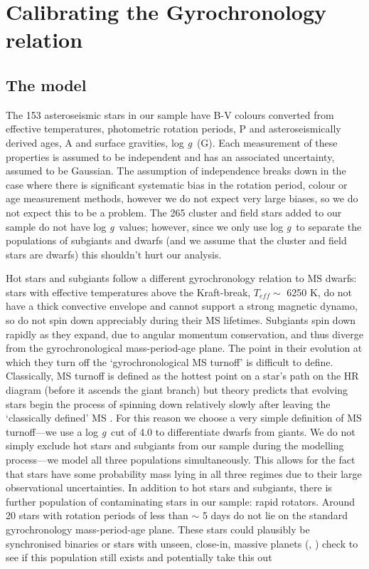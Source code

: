 \documentclass[12pt,preprint]{aastex}
\newcommand{\logg}{log \emph{g}~}
\begin{document}
\section{Calibrating the Gyrochronology relation}
\label{sec:gyro_cal}

\subsection{The model}

The 153 asteroseismic stars in our sample have B-V colours converted from effective temperatures, photometric rotation periods, P and asteroseismically derived ages, A and surface gravities, \logg (G).
Each measurement of these properties is assumed to be independent and has an associated uncertainty, assumed to be Gaussian.
The assumption of independence breaks down in the case where there is significant systematic bias in the rotation period, colour or age measurement methods, however we do not expect very large biases, so we do not expect this to be a problem.
The 265 cluster and field stars added to our sample do not have \logg values; however, since we only use \logg to separate the populations of subgiants and dwarfs (and we assume that the cluster and field stars are dwarfs) this shouldn't hurt our analysis.

Hot stars and subgiants follow a different gyrochronology relation to MS dwarfs: stars with effective temperatures above the Kraft-break, $T_{eff} \sim$ 6250 K, \citep{Kraft1967} do not have a thick convective envelope and cannot support a strong magnetic dynamo, so do not spin down appreciably during their MS lifetimes.
Subgiants spin down rapidly as they expand, due to angular momentum conservation, and thus diverge from the gyrochronological mass-period-age plane.
The point in their evolution at which they turn off the `gyrochronological MS turnoff' is difficult to define.
Classically, MS turnoff is defined as the hottest point on a star's path on the HR diagram (before it ascends the giant branch) but theory predicts that evolving stars begin the process of spinning down relatively slowly after leaving the `classically defined' MS \citep{vanSaders2013}.
For this reason we choose a very simple definition of MS turnoff---we use a \logg cut of 4.0 to differentiate dwarfs from giants.
We do not simply exclude hot stars and subgiants from our sample during the modelling process---we model all three populations simultaneously.
This allows for the fact that stars have some probability mass lying in all three regimes due to their large observational uncertainties.
In addition to hot stars and subgiants, there is further population of contaminating stars in our sample: rapid rotators.
Around 20 stars with rotation periods of less than $\sim$ 5 days do not lie on the standard gyrochronology mass-period-age plane.
These stars could plausibly be synchronised binaries or stars with unseen, close-in, massive planets (\citet{Poppenhaeger2014}, \citet{Beky2014})
{\color{red} check to see if this population still exists and potentially take this out}
\end{document}

